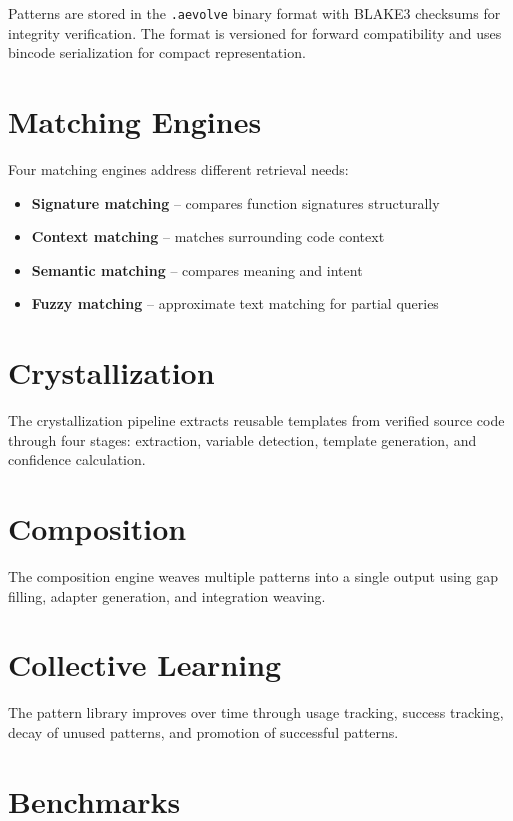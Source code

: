 \documentclass[11pt,a4paper]{article}
\begin{document}
Patterns are stored in the \texttt{.aevolve} binary format with BLAKE3
checksums for integrity verification. The format is versioned for forward
compatibility and uses bincode serialization for compact representation.

\section{Matching Engines}

Four matching engines address different retrieval needs:
\begin{itemize}
  \item \textbf{Signature matching} -- compares function signatures structurally
  \item \textbf{Context matching} -- matches surrounding code context
  \item \textbf{Semantic matching} -- compares meaning and intent
  \item \textbf{Fuzzy matching} -- approximate text matching for partial queries
\end{itemize}

\section{Crystallization}

The crystallization pipeline extracts reusable templates from verified source
code through four stages: extraction, variable detection, template generation,
and confidence calculation.

\section{Composition}

The composition engine weaves multiple patterns into a single output using
gap filling, adapter generation, and integration weaving.

\section{Collective Learning}

The pattern library improves over time through usage tracking, success tracking,
decay of unused patterns, and promotion of successful patterns.

\section{Benchmarks}
\end{document}
